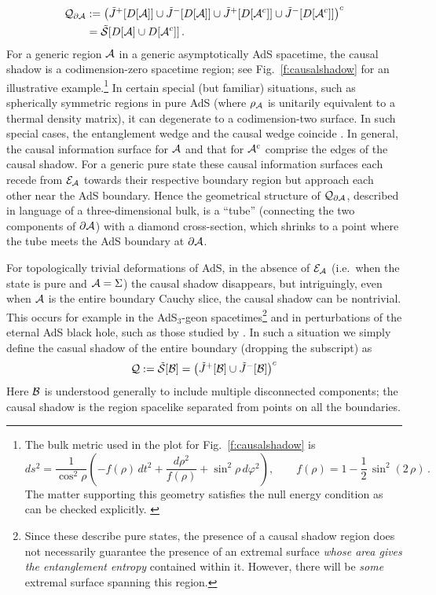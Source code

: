 \documentclass[12pt]{article}
\def\bulkJ{{\tilde J}}
\def\bulksplsep{{\tilde {\cal S}}}
\def\AdS#1{\AdS$_{#1}$}
\def\bdy{{\cal B}}
\def\regA{{\cal A}}
\def\regAc{{\cal A}^c}
\def\rhoA{{\rho_{\regA}}}
\def\entsurf{
\partial \regA}
\def\domdA{D[\regA]}
\def\domdAc{D[\regAc]}
\def\extr{{\cal E}_\regA}
\def\shadow{{\cal Q}}
\def\AdS#1{AdS$_{#1}$}
\begin{document}
%
\begin{align}
\shadow_{\entsurf}
& := \left(\bulkJ^+[\domdA]\cup\bulkJ^-[\domdA] \cup \bulkJ^+[\domdAc]\cup\bulkJ^-[\domdAc]\right)^c
\nonumber \\
 &= \bulksplsep[\domdA \cup \domdAc]\,.
\label{shadowdef}
\end{align}	
%
For a generic region $\regA$ in a generic asymptotically AdS spacetime, the causal shadow is a codimension-zero spacetime region; see Fig.~\ref{f:causalshadow} for an illustrative example.\footnote{ The bulk metric used in the plot for Fig.~\ref{f:causalshadow} is 
%
\begin{equation*}
ds^2 =\frac{1}{\cos^2\rho} \left(-f(\rho)\, dt^2 + \frac{d\rho^2}{f(\rho)} + \sin^2\rho \, d\varphi^2 \right) ,\qquad f(\rho) = 1-\frac{1}{2}\, \sin^2(2\,\rho)\,.
\end{equation*}	
%
The matter supporting this geometry satisfies the null energy condition as can be checked explicitly. \label{fn:metric}
 } 
 In certain special (but familiar) situations, such as spherically symmetric regions in pure AdS (where $\rhoA$ is unitarily equivalent to a thermal density matrix), it can degenerate to a codimension-two surface. In such special cases, the entanglement wedge and the causal wedge coincide \cite{Hubeny:2012wa}.
In general, the causal information surface for $\regA$ and that for $\regAc$ comprise the edges of the causal shadow. For a  generic pure state these causal information surfaces each recede from $\extr$ towards their respective boundary region but approach each other near the AdS boundary.  Hence the geometrical structure of $\shadow_{\entsurf}$, described in language of a three-dimensional bulk, is a ``tube'' (connecting the two components of $\entsurf$) with a diamond cross-section, which shrinks to a point where the tube meets the AdS boundary at $\entsurf$.

For topologically trivial deformations of AdS, in the absence of $\extr$ (i.e.\  when the state is pure and $\regA = \Sigma$) the causal shadow disappears, but intriguingly, even when $\regA$ is the entire boundary Cauchy slice, the causal shadow can be nontrivial. This occurs for example in the \AdS{3}-geon spacetimes\footnote{ 
Since these describe pure states, the presence of a causal shadow region does not necessarily guarantee the presence of an extremal surface {\it whose area gives the entanglement entropy} contained within it.  
However, there will be {\it some} extremal surface spanning this region.} \cite{Balasubramanian:2014hda} and in  perturbations of the eternal AdS black hole, such as those studied by \cite{Shenker:2013pqa}. In such  a situation we simply define the casual shadow of the entire boundary (dropping the subscript) as
%
\begin{align}
\shadow := \bulksplsep[ \bdy] =\left(\bulkJ^+[{\bdy}]\cup\bulkJ^-[\bdy]\right)^c
\label{}
\end{align}	
%
Here $\bdy$ is understood generally to include multiple disconnected components; the causal shadow is the region spacelike separated from points on all the boundaries.
\end{document}
